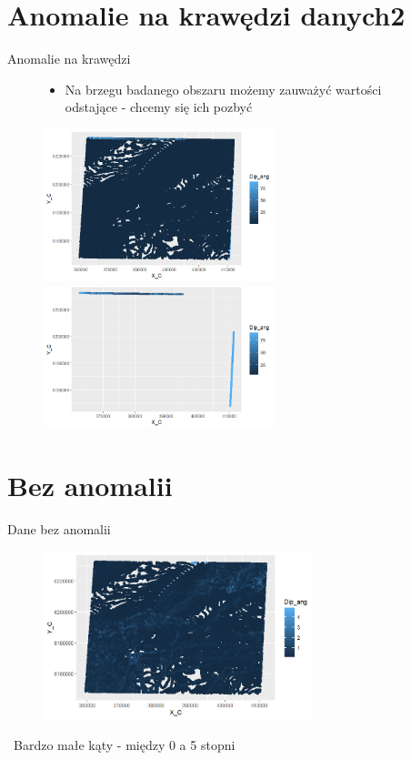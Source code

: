 \documentclass{beamer}
\begin{document}
\section{Anomalie na krawędzi danych2}
\begin{frame}{Anomalie na krawędzi}
	\begin{figure}
		\begin{itemize}
			\item Na brzegu badanego obszaru możemy zauważyć wartości odstające - chcemy się ich pozbyć
		\end{itemize}
		\includegraphics[width=0.60\textwidth]{przed_obrobka.png}
		\includegraphics[width=0.60\textwidth]{anomalia.png}
	\end{figure}
\end{frame}

\section{Bez anomalii}
\begin{frame}{Dane bez anomalii}
	\begin{figure}
		\includegraphics[width=0.7\textwidth]{bez_anomalii.png}
	\end{figure}
	
		\centering
		\ Bardzo małe kąty - między 0 a 5 stopni

\end{frame}
\end{document}
